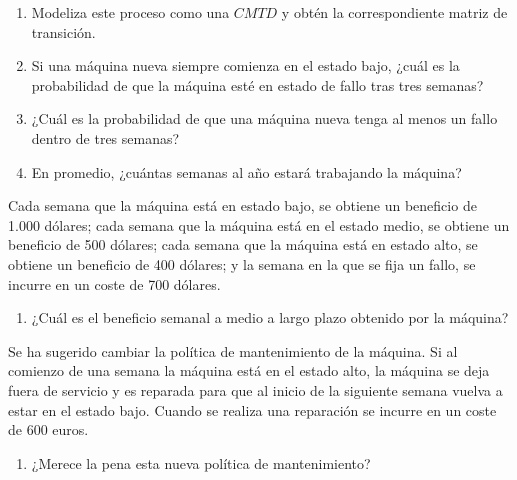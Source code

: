 \documentclass[
]{book}
\providecommand{\tightlist}{%
  \setlength{\itemsep}{0pt}\setlength{\parskip}{0pt}}
\theoremstyle{definition}
\theoremstyle{definition}
\theoremstyle{definition}
\theoremstyle{definition}
\theoremstyle{remark}
\begin{document}
\begin{enumerate}
\def\labelenumi{\arabic{enumi}.}
\tightlist
\item
  Modeliza este proceso como una \(CMTD\) y obtén la correspondiente matriz de transición.
\item
  Si una máquina nueva siempre comienza en el estado bajo, ¿cuál es la probabilidad de que la máquina esté en estado de fallo tras tres semanas?
\item
  ¿Cuál es la probabilidad de que una máquina nueva tenga al menos un fallo dentro de tres semanas?
\item
  En promedio, ¿cuántas semanas al año estará trabajando la máquina?
\end{enumerate}

Cada semana que la máquina está en estado bajo, se obtiene un beneficio de 1.000 dólares; cada semana que la máquina está en el estado medio, se obtiene un beneficio de 500 dólares; cada semana que la máquina está en estado alto, se obtiene un beneficio de 400 dólares; y la semana en la que se fija un fallo, se incurre en un coste de 700 dólares.

\begin{enumerate}
\def\labelenumi{\arabic{enumi}.}
\setcounter{enumi}{4}
\tightlist
\item
  ¿Cuál es el beneficio semanal a medio a largo plazo obtenido por la máquina?
\end{enumerate}

Se ha sugerido cambiar la política de mantenimiento de la máquina. Si al comienzo de una semana la máquina está en el estado alto, la máquina se deja fuera de servicio y es reparada para que al inicio de la siguiente semana vuelva a estar en el estado bajo. Cuando se realiza una reparación se incurre en un coste de 600 euros.

\begin{enumerate}
\def\labelenumi{\arabic{enumi}.}
\setcounter{enumi}{5}
\tightlist
\item
  ¿Merece la pena esta nueva política de mantenimiento?
\end{enumerate}
\end{document}
